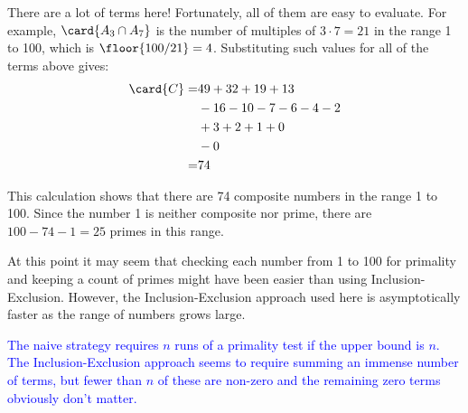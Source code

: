 \begin{editingnotes}
There are a lot of terms here!  Fortunately, all of them are easy to
evaluate.  For example, $\card{A_3 \cap A_7}$ is the number of multiples
of $3 \cdot 7 = 21$ in the range 1 to 100, which is $\floor{100/21} = 4$.
\iffalse (Note that there is no reason to subtract 1 as we did when
evaluating $\card{A_m}$ above.)\fi Substituting such values for all of the
terms above gives:
\begin{align*}
\card{C}  = & 49 + 32 + 19 + 13 \\
            & - 16 - 10 - 7 - 6 - 4 - 2 \\
            & + 3 + 2 + 1 + 0 \\
            & - 0 \\
          = & 74
\end{align*}

This calculation shows that there are 74 composite numbers in the
range 1 to 100.  Since the number 1 is neither composite nor prime,
there are $100 - 74 - 1 = 25$ primes in this range.

At this point it may seem that checking each number from 1 to 100 for
primality and keeping a count of primes might have been easier than using
Inclusion-Exclusion.  However, the Inclusion-Exclusion approach used here
is asymptotically faster as the range of numbers grows large.

\textcolor{blue}{The naive strategy requires $n$ runs of a primality
  test if the upper bound is $n$.  The Inclusion-Exclusion approach
  seems to require summing an immense number of terms, but fewer than
  $n$ of these are non-zero and the remaining zero terms obviously
  don't matter.}
\end{editingnotes}


